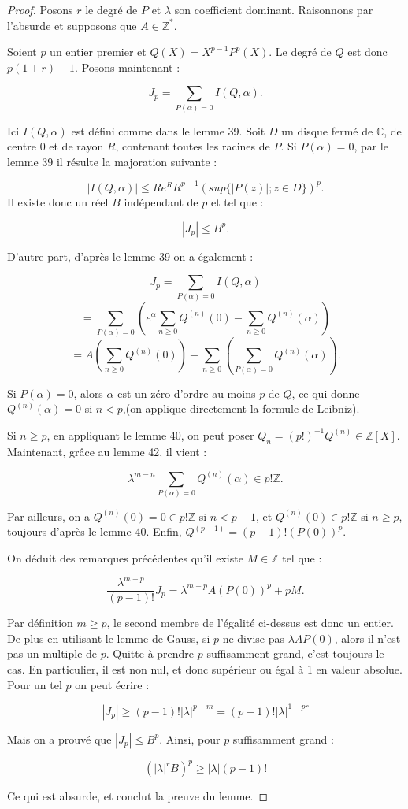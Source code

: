 \documentclass[12pt,a4paper]{report}
\begin{document}
\begin{proof}
Posons $r$ le degré de $P$ et $\lambda$ son coefficient dominant. Raisonnons par l'absurde et supposons que $A\in \mathbb{Z}^{*}$.

Soient $p$ un entier premier et $Q(X)=X^{p-1}P^{p}(X)$. Le degré de $Q$ est donc $p(1+r)-1$. Posons maintenant : 

$$J_{p}=\sum_{P(\alpha)=0} I(Q,\alpha).$$

Ici $ I(Q,\alpha)$ est défini comme dans le lemme 39. Soit $D$ un disque fermé de $\mathbb{C}$, de centre 0 et de rayon $R$, contenant toutes les racines de $P$. Si $P(\alpha)=0$, par le lemme 39 il résulte la majoration suivante : 

$$|I(Q,\alpha)| \leq R e^{R} R^{p-1}(sup\{|P(z)|;z\in D\})^{p}.$$
Il existe donc un réel $B$ indépendant de $p$ et tel que : 

$$|J_{p}|\leq B^{p}.$$

D'autre part, d'après le lemme 39 on a également : 

$$J_{p}=\sum_{P(\alpha)=0} I(Q,\alpha)$$
$$=\sum_{P(\alpha)=0}\left( e^{\alpha}\sum_{n\geq0} Q^{(n)}(0)-\sum_{n\geq0} Q^{(n)}(\alpha)\right)$$
$$=A\left(\sum_{n\geq 0}Q^{(n)}(0)\right)-\sum_{n\geq 0} \left(\sum_{P(\alpha)=0} Q^{(n)}(\alpha)\right).$$

Si $P(\alpha)=0$, alors $\alpha$ est un zéro d'ordre au moins $p$ de $Q$, ce qui donne $Q^{(n)}(\alpha)=0$ si $n<p$,(on applique directement la formule de Leibniz).

Si $n\geq p$, en appliquant le lemme 40, on peut poser $Q_{n}=(p!)^{-1}Q^{(n)} \in \mathbb{Z}[X]$. Maintenant, grâce au lemme 42, il vient : 

$$ \lambda^{m-n} \sum_{P(\alpha)=0} Q^{(n)}(\alpha) \in p!\mathbb{Z}.$$ 

Par ailleurs, on a $Q^{(n)}(0)=0 \in p!\mathbb{Z}$ si $n<p-1$, et $Q^{(n)}(0) \in p! \mathbb{Z}$ si $n\geq p$, toujours d'après le lemme 40. Enfin, $Q^{(p-1)} = (p-1)!(P(0))^{p}.$

On déduit des remarques précédentes qu'il existe $M \in \mathbb{Z}$ tel que : 

$$\dfrac{\lambda^{m-p}}{(p-1)!}J_{p}=\lambda^{m-p}A(P(0))^{p}+pM.$$

Par définition $m\geq p$, le second membre de l'égalité ci-dessus est donc un entier. De plus en utilisant le lemme de Gauss, si $p$ ne divise pas $\lambda A P(0)$, alors il n'est pas un multiple de $p$. Quitte à prendre $p$ suffisamment grand, c'est toujours le cas. En particulier, il est non nul, et donc supérieur ou égal à 1 en valeur absolue. Pour un tel $p$ on peut écrire : 

$$|J_{p}|\geq (p-1)!|\lambda|^{p-m}= (p-1)!|\lambda|^{1-pr}$$

Mais on a prouvé que $|J_{p}|\leq B^{p}$. Ainsi, pour $p$ suffisamment grand : 

$$(|\lambda|^{r}B)^{p}\geq |\lambda| (p-1)!$$

Ce qui est absurde, et conclut la preuve du lemme. 


\end{proof}
\end{document}
